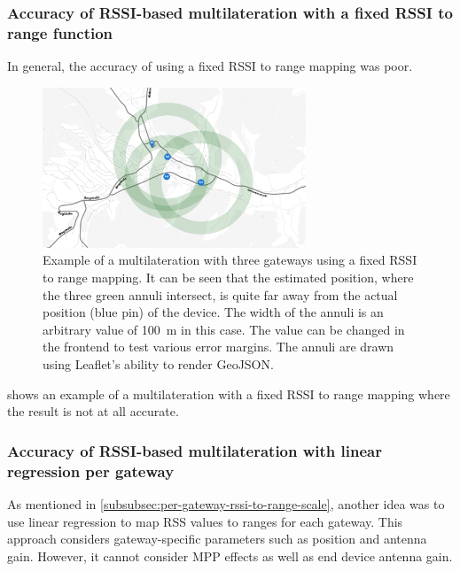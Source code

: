 \subsubsection{Accuracy of \acs{RSSI}-based multilateration with a fixed \acs{RSSI} to range function}\label{subsubsec:conclusion-rssi-fixed-scale}

In general, the accuracy of using a fixed \ac{RSSI} to range mapping was poor.

\begin{figure}[htbp]
    \centering
    \includegraphics[width=0.7\textwidth]{pictures/ttn-locator/frontend/multilateration/rssi_range_multilateration_bad_example.png}
    \caption{
        Example of a multilateration with three gateways using a fixed \ac{RSSI} to range mapping.
        It can be seen that the estimated position, where the three green annuli intersect, is quite far away from the actual position (blue pin) of the device.
        The width of the annuli is an arbitrary value of \SI{100}{\meter} in this case.
        The value can be changed in the frontend to test various error margins.
        The annuli are drawn using Leaflet's ability to render GeoJSON.
    }\label{pic:bad-rssi-to-range-multilateration-example}
\end{figure}

 shows an example of a multilateration with a fixed \ac{RSSI} to range mapping where the result is not at all accurate.

\subsubsection{Accuracy of \acs{RSSI}-based multilateration with linear regression per gateway}\label{subsubsec:conclusion-rssi-linear-regression}

As mentioned in \cref{subsubsec:per-gateway-rssi-to-range-scale}, another idea was to use linear regression to map \ac{RSS} values to ranges for each gateway.
This approach considers gateway-specific parameters such as position and antenna gain.
However, it cannot consider \ac{MPP} effects as well as end device antenna gain.

